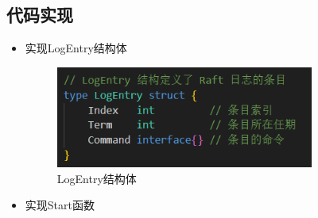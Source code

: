 \documentclass[]{article}
\begin{document}
	\subsection{代码实现}
	\begin{itemize}
		\item 实现LogEntry结构体
		\begin{figure}[H]
			\centering
			\includegraphics[width=0.8\textwidth]{./2B/LogEntry.png}
			\caption{LogEntry结构体}
		\end{figure}
		\item 实现Start函数
		\begin{figure}[H]
			\centering

\end{figure}
\end{itemize}
\end{document}
